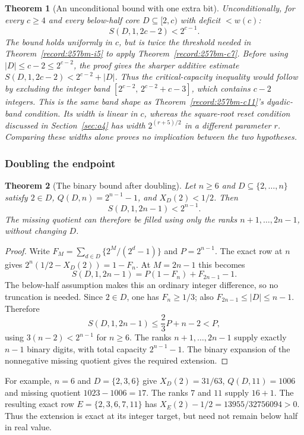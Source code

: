 \documentclass[11pt]{article}
\theoremstyle{plain}
\newtheorem{thm}{Theorem}[section]
\theoremstyle{definition}
\theoremstyle{remark}
\begin{document}
\begin{thm}[An unconditional bound with one extra bit]\label{record:257bm-i6}
Unconditionally, for every $c\ge4$ and every below-half core $D\subseteq[2,c)$ with deficit
$<\ensuremath{w}(c)$:
\[
\ensuremath{S}(D,1,2c-2) < 2^{c-1}.
\]
The bound holds uniformly in $c$, but is twice the threshold needed
in Theorem~\ref{record:257bm-i5} to apply Theorem~\ref{record:257bm-c7}.
Before using $|D|\le c-2\le2^{c-2}$, the proof gives the sharper
additive estimate
$\ensuremath{S}(D,1,2c-2)<2^{c-2}+|D|$.
Thus the critical-capacity inequality would follow by excluding the
integer band $[2^{c-2},\,2^{c-2}+c-3]$, which contains $c-2$ integers. This is the same band
shape as Theorem~\ref{record:257bm-c11}'s dyadic-band condition.
Its width is linear in $c$, whereas the square-root reset condition
discussed in Section~\ref{sec:o4} has width $2^{(r+5)/2}$ in a
different parameter $r$.  Comparing these widths alone proves no implication
between the two hypotheses.
\end{thm}

\subsubsection*{Doubling the endpoint}

\begin{thm}[The binary bound after doubling]\label{record:257bm-i7}
Let $n\ge6$ and $D\subseteq\{2,\ldots,n\}$ satisfy
$2\in D$, $Q(D,n)=2^{n-1}-1$, and $X_D(2)<1/2$.  Then
\[
 S(D,1,2n-1)<2^{n-1}.
\]
The missing quotient can therefore be filled using only the ranks
$n+1,\ldots,2n-1$, without changing $D$.
\end{thm}

\begin{proof}
Write $F_M=\sum_{d\in D}\{2^M/(2^d-1)\}$ and $P=2^{n-1}$.
The exact row at $n$ gives
$2^n(1/2-X_D(2))=1-F_n$.
At $M=2n-1$ this becomes
\[
 S(D,1,2n-1)=P(1-F_n)+F_{2n-1}-1.
\]
The below-half assumption makes this an ordinary integer difference,
so no truncation is needed.  Since $2\in D$, one has $F_n\ge1/3$;
also $F_{2n-1}\le|D|\le n-1$.  Therefore
\[
 S(D,1,2n-1)\le\frac23P+n-2<P,
\]
using $3(n-2)<2^{n-1}$ for $n\ge6$.
The ranks $n+1,\ldots,2n-1$ supply exactly $n-1$ binary digits,
with total capacity $2^{n-1}-1$.  The binary expansion of the
nonnegative missing quotient gives the required extension.
\end{proof}

For example, $n=6$ and $D=\{2,3,6\}$ give $X_D(2)=31/63$,
$Q(D,11)=1006$ and missing quotient $1023-1006=17$.
The ranks $7$ and $11$ supply $16+1$.
The resulting exact row $E=\{2,3,6,7,11\}$ has
$X_E(2)-1/2=13955/32756094>0$.
Thus the extension is exact at its integer target, but need not
remain below half in real value.
\end{document}
